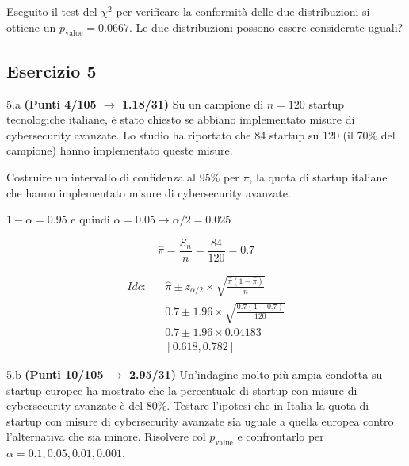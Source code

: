\documentclass[
  11pt,
]{book}
\theoremstyle{mytheoremstyle}
\theoremstyle{mydefstyle}
\newenvironment{sol}
  {
  \begin{tcolorbox}[enhanced,breakable,arc=0.1mm,boxrule=1pt,colback=white,colframe=iblue,
  title=\bf \fontfamily{lmss}\selectfont \hspace{.5 cm} Soluzione,drop fuzzy shadow]

}{
\end{tcolorbox}
  }
\begin{document}
Eseguito il test del \(\chi^2\) per verificare la conformità delle due distribuzioni si ottiene un \(p_\text{value}=0.0667\). Le due distribuzioni possono essere considerate uguali?

\subsection{Esercizio 5}\label{esercizio-5-40}

5.a \textbf{(Punti 4/105 \(\rightarrow\) 1.18/31)} Su un campione di \(n = 120\) startup tecnologiche italiane, è stato chiesto se abbiano implementato misure di cybersecurity avanzate. Lo studio ha riportato che 84 startup su 120 (il 70\% del campione) hanno implementato queste misure.

Costruire un intervallo di confidenza al 95\% per \(\pi\), la quota di startup italiane che hanno implementato misure di cybersecurity avanzate.

\begin{sol}
\(1-\alpha =0.95\) e quindi \(\alpha=0.05\rightarrow \alpha/2=0.025\)

\[
  \hat\pi = \frac{S_n}n = \frac{ 84 }{ 120 }= 0.7 
\]

\begin{eqnarray*}
  Idc: & &  \hat\pi \pm  z_{\alpha/2} \times \sqrt{\frac{\hat\pi(1-\hat\pi)}{n}} \\
     & &  0.7 \pm  1.96 \times \sqrt{\frac{ 0.7 (1- 0.7 )}{ 120 }} \\
     & &  0.7 \pm  1.96 \times  0.04183 \\
     & & [ 0.618 ,  0.782 ]
\end{eqnarray*}

\end{sol}

5.b \textbf{(Punti 10/105 \(\rightarrow\) 2.95/31)} Un'indagine molto più ampia condotta su startup europee ha mostrato che la percentuale di startup con misure di cybersecurity avanzate è del 80\%. Testare l'ipotesi che in Italia la quota di startup con misure di cybersecurity avanzate sia uguale a quella europea contro l'alternativa che sia minore. Risolvere col \(p_\text{value}\) e confrontarlo per \(\alpha=0.1,0.05,0.01,0.001\).
\end{document}

